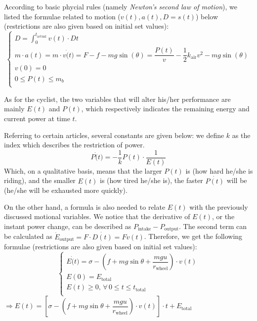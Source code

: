\documentclass{article}
\begin{document}
\begin{itemize}
					According to basic phycial rules (namely \textit{Newton's second law of motion}), we listed the formulae related to motion (\(v\left( t \right) ,a\left( t \right) ,D=s\left( t \right) \)) below (restrictions are also given based on initial set values):
					$$
					\begin{cases}
						\displaystyle
						D=\int^{t_\mathrm{actual}}_0 v(t)\cdot  D t\\
						m \cdot  a (t)=m \cdot v\dot(t)=F-f-mg\sin\left(\theta\right)=\dfrac{P (t)}{v}-\dfrac{1}{2} k_{\mathrm{air}} v^2-mg\sin\left(\theta\right)\\
						v(0)=0\\
						0\leq P (t)\leq m_ b\\
					\end{cases}
					$$

					As for the cyclist, the two variables that will alter his/her performance are mainly \(E(t)\) and \(P(t)\), which respectively indicates the remaining energy and current power at time \(t\).

					Referring to certain articles\cite{114514}, several constants are given below: we define $k$ as the index which describes the restriction of power.
					\[P \dot(t)=-\dfrac{1}{ k } P (t) \cdot \dfrac{1}{ E (t)}\]
					Which, on a qualitative basis, means that the larger \(P(t)\) is (how hard he/she is riding), and the smaller \(E(t)\) is (how tired he/she is), the faster \(\dot{P(t)}\) will be (he/she will be exhausted more quickly).

					On the other hand, a formula is also needed to relate \(E(t)\) with the previously discussed motional variables. We notice that the derivative of \(E(t)\), or the instant power change, can be described as \(P_{\mathrm{intake}} - P_{\mathrm{output}}\). The second term can be calculated as \(\dot{E}_{\mathrm{output}}=F\cdot \dot{D\left( t \right)} =Fv\left( t \right) \). Therefore, we get the following formulae (restrictions are also given based on initial set values):
					$$
					\begin{cases}
						\displaystyle
						E \dot(t)=\sigma-\left(f+mg\sin\theta+\dfrac{mgu}{r_{\mathrm{wheel}}}\right)\cdot v(t) \\
						E (0)= E _\mathrm{total} \\
						E (t)\geq0,\, \forall\,0 \leq t \leq t_\mathrm{total} \\
					\end{cases}
					$$
					\(\Rightarrow E (t)=\left[\sigma-\left(f+mg\sin \theta +\dfrac{mgu}{r_{\mathrm{wheel}}} \right)\cdot v(t)\right]\cdot t+ E _\mathrm{total}\)


\end{itemize}
\end{document}

